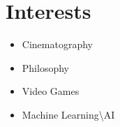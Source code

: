 \documentclass[letterpaper,11pt]{article}
\newcommand{\resumeSubHeadingListEnd}{\end{itemize}}
\begin{document}

\section{Interests}
    \begin{multicols}{4}
        \begin{itemize}[itemsep=-5pt, parsep=3pt]
            \item\small Cinematography
            \item Philosophy
            \item Video Games
            \item Machine Learning\textbackslash{AI}
        \end{itemize}
    \end{multicols}
    \vspace*{2.0\multicolsep}
\end{document}
